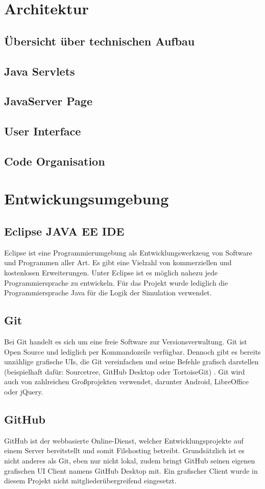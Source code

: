 \clearpage
\chapter{Architektur}
\section{Übersicht über technischen Aufbau}
\section{Java Servlets}
\section{JavaServer Page}
\section{User Interface}
\section{Code Organisation}

\clearpage
\chapter{Entwickungsumgebung}
\section{Eclipse JAVA EE IDE}
Eclipse ist eine Programmierumgebung als Entwicklungswerkzeug von Software und Programmen aller Art. Es gibt eine Vielzahl von kommerziellen und kostenlosen Erweiterungen. Unter Eclipse ist es möglich nahezu jede Programmiersprache zu entwickeln. Für das Projekt wurde lediglich die Programmiersprache Java für die Logik der Simulation verwendet.
\section{Git}
Bei Git handelt es sich um eine freie Software zur Versionsverwaltung. Git ist Open Source und lediglich per Kommandozeile verfügbar. Dennoch gibt es bereits unzählige grafische UIs, die Git vereinfachen und seine Befehle grafisch darstellen (beispielhaft dafür: Sourcetree, GitHub Desktop oder TortoiseGit) . Git wird auch von zahlreichen Großprojekten verwendet, darunter Android, LibreOffice oder jQuery.
\section{GitHub}
GitHub ist der webbasierte Online-Dienst, welcher Entwicklungsprojekte auf einem Server bereitstellt und somit Filehosting betreibt. Grundsätzlich ist es nicht anderes als Git, eben nur nicht lokal, zudem bringt GitHub seinen eigenen grafischen UI Client namens GitHub Desktop mit. Ein grafischer Client wurde in diesem Projekt nicht mitgliederübergreifend eingesetzt.
